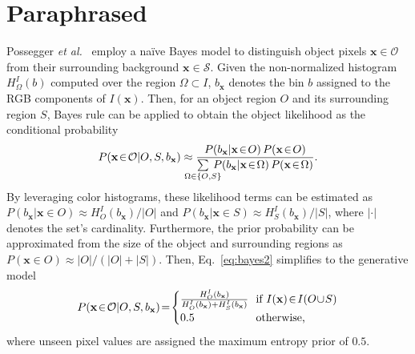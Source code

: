 \documentclass[a4paper,10pt]{article}
\renewcommand{\vec}[1]{\ensuremath{\mathbf{#1}}}
\begin{document}
\section*{Paraphrased}
Possegger \emph{et al.}~\cite{possegger15} employ a na\"ive Bayes model to distinguish object pixels $\vec{x}\in\mathcal{O}$ from their surrounding background $\vec{x}\in\mathcal{S}$. 
Given the non-normalized histogram $H^I_\Omega(b)$ computed over the region $\Omega\subset I$, $b_\vec{x}$ denotes the bin $b$ assigned to the RGB components of $I(\vec{x})$.
Then, for an object region $O$ and its surrounding region $S$, Bayes rule can be applied to obtain the object likelihood as the conditional probability
\begin{align}
  P\!\left(\vec{x}\!\in\!\mathcal{O}|O,S,b_\vec{x}\right) \approx \frac{P\!\left( b_\vec{x}|\vec{x}\!\in\!O\right)  P\!\left(\vec{x}\!\in\!O\right)}{\sum\limits_{\mathclap{\Omega\in\{O,S\}}}{\:P\!\left(b_\vec{x}|\vec{x}\!\in\!\Omega\right) P\!\left(\vec{x}\!\in\!\Omega\right)}}\label{eq:bayes2}.
\end{align}
By leveraging color histograms, these likelihood terms can be estimated as $P\!\left( b_\vec{x}|\vec{x}\!\in\!O\right) \approx H^I_O(b_\vec{x})/|O|$ and $P\!\left( b_\vec{x}|\vec{x}\!\in\!S\right) \approx H^I_S(b_\vec{x})/|S|$, where $|\cdot|$ denotes the set's cardinality.
Furthermore, the prior probability can be approximated from the size of the object and surrounding regions as $P\!\left(\vec{x}\!\in\!O\right)\approx|O|/(|O|+|S|)$.
Then, Eq.~\eqref{eq:bayes2} simplifies to the generative model
\begin{gather}
\begin{aligned}
  P\!\left(\vec{x}\!\in\!\mathcal{O}|O,S,b_\vec{x}\right)\!=\!\begin{cases}
                                                                            \frac{H^I_{O}(b_\vec{x})}{H^I_{O}(b_\vec{x}) + H^I_{S}(b_\vec{x})} & \!\!\text{if $I(\vec{x})\!\in\!I(O\!\cup\!S)$}\\
                                                                            0.5 & \!\!\text{otherwise,}
                                                                          \end{cases}\label{eq:om_surr2}
\end{aligned}\raisetag{\baselineskip}
\end{gather}
where unseen pixel values are assigned the maximum entropy prior of $0.5$.
\end{document}
